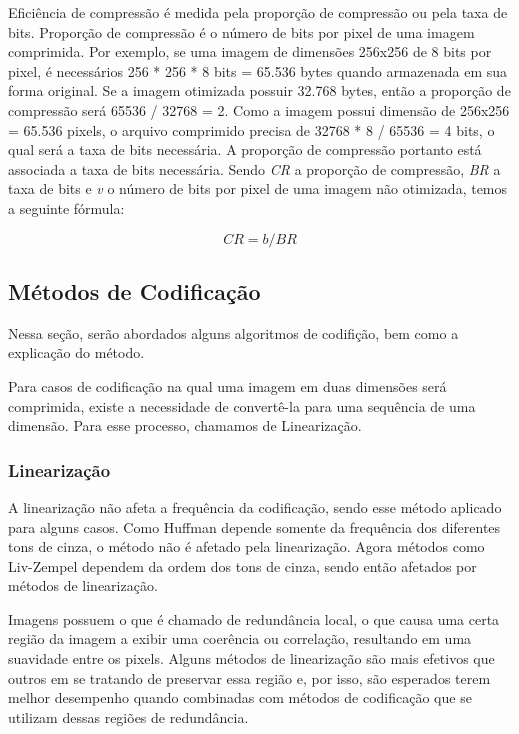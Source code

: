 Eficiência de compressão é medida pela proporção de compressão ou pela taxa de bits. Proporção de compressão é o número de bits por pixel de uma imagem comprimida. Por exemplo, se uma imagem de dimensões 256x256 de 8 bits por pixel, é necessários 256 * 256 * 8 bits = 65.536 bytes quando armazenada em sua forma original. Se a imagem otimizada possuir 32.768 bytes, então a proporção de compressão será 65536 / 32768 = 2. Como a imagem possui dimensão de 256x256 = 65.536 pixels, o arquivo comprimido precisa de 32768 * 8 / 65536 = 4 bits, o qual será a taxa de bits necessária. A proporção de compressão portanto está associada a taxa de bits necessária. Sendo {\em CR} a proporção de compressão, {\em BR} a taxa de bits e {\em v} o número de bits por pixel de uma imagem não otimizada, temos a seguinte fórmula:

\[ CR = b / BR \]

\subsection{Métodos de Codificação}
\label{ss.codingmethod}

Nessa seção, serão abordados alguns algoritmos de codifição, bem como a explicação do método.

Para casos de codificação na qual uma imagem em duas dimensões será comprimida, existe a necessidade de convertê-la para uma sequência de uma dimensão. Para esse processo, chamamos de Linearização.

\subsubsection{Linearização}
\label{sss.linearlization}

A linearização não afeta a frequência da codificação, sendo esse método aplicado para alguns casos. Como Huffman depende somente da frequência dos diferentes tons de cinza, o método não é afetado pela linearização. Agora métodos como Liv-Zempel dependem da ordem dos tons de cinza, sendo então afetados por métodos de linearização.

Imagens possuem o que é chamado de redundância local, o que causa uma certa região da imagem a exibir uma coerência ou correlação, resultando em uma suavidade entre os pixels. Alguns métodos de linearização são mais efetivos que outros em se tratando de preservar essa região e, por isso, são esperados terem melhor desempenho quando combinadas com métodos de codificação que se utilizam dessas regiões de redundância.

